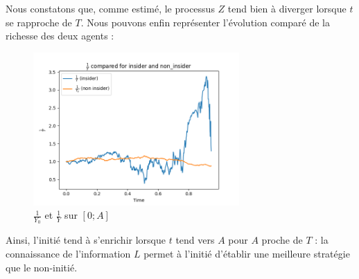 \documentclass[../finalreport.tex]{subfiles}
\begin{document}
\par Nous constatons que, comme estimé, le processus $Z$ tend bien à diverger lorsque $t$ se rapproche de $T$. Nous pouvons enfin représenter l'évolution comparé de la richesse des deux agents :

\begin{figure}[H]
  \centering
    \includegraphics[width=0.7\textwidth]{images/simulation_1/compared_wealths.png}
  \caption{$\frac{1}{Y_0}$ et $\frac{1}{Y}$ sur $\left[0; A \right]$}
\end{figure}

\par Ainsi, l'initié tend à s'enrichir lorsque $t$ tend vers $A$ pour $A$ proche de $T$ : la connaissance de l'information $L$ permet à l'initié d'établir une meilleure stratégie que le non-initié.
\end{document}
